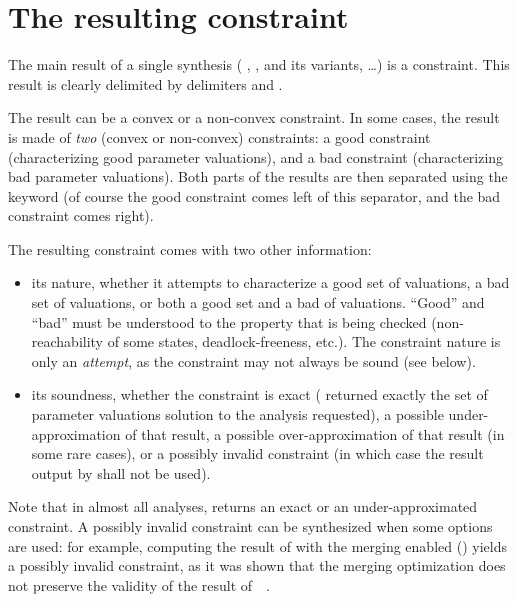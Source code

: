 \section{The resulting constraint}

The main result of a single synthesis (\ie{} \EFsynth{}, \PDFC{}, \IM{} and its variants, \PRP{}…) is a constraint.
This result is clearly delimited by delimiters  and .

The result can be a convex or a non-convex constraint.
In some cases, the result is made of \emph{two} (convex or non-convex) constraints: a good constraint (characterizing good parameter valuations), and a bad constraint (characterizing bad parameter valuations).
Both parts of the results are then separated using the keyword  (of course the good constraint comes left of this separator, and the bad constraint comes right).

The resulting constraint comes with two other information:
\begin{itemize}
	\item its nature, \ie{} whether it attempts to characterize a good set of valuations, a bad set of valuations, or both a good set and a bad of valuations.
	      ``Good'' and ``bad'' must be understood to the property that is being checked (non-reachability of some states, deadlock-freeness, etc.).
	      The constraint nature is only an \emph{attempt}, as the constraint may not always be sound (see below).
	\item its soundness, \ie{} whether the constraint is exact (\imitator{} returned exactly the set of parameter valuations solution to the analysis requested), a possible under-approximation of that result, a possible over-approximation of that result (in some rare cases), or a possibly invalid constraint (in which case the result output by \imitator{} shall not be used).
\end{itemize}
Note that in almost all analyses, \imitator{} returns an exact or an under-approximated constraint.
A possibly invalid constraint can be synthesized when some options are used: for example, computing the result of \IM{} with the merging enabled () yields a possibly invalid constraint, as it was shown that the merging optimization does not preserve the validity of the result of~\IM{}~\cite{AFS13atva}.

